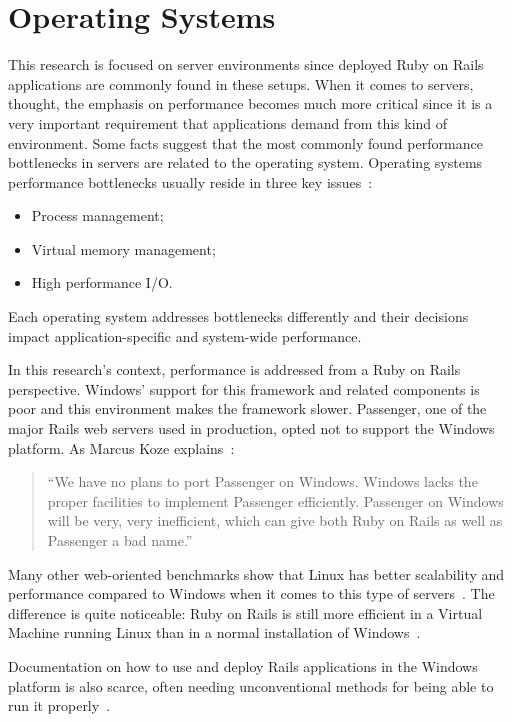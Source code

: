 \section{Operating Systems} %
\label{state:sec:operating_systems}

This research is focused on server environments since deployed Ruby on Rails applications are commonly found in these setups. When it comes to servers, thought, the emphasis on performance becomes much more critical since it is a very important requirement that applications demand from this kind of environment. Some facts suggest that the most commonly found performance bottlenecks in servers are related to the operating system. Operating systems performance bottlenecks usually reside in three key issues~\cite{os_performance_server}:
\begin{itemize}
\item Process management;
\item Virtual memory management;
\item High performance I/O.
\end{itemize}
Each operating system addresses bottlenecks differently and their decisions impact application-specific and system-wide performance.

In this research's context, performance is addressed from a Ruby on Rails perspective. Windows' support for this framework and related components is poor and this environment makes the framework slower. Passenger, one of the major Rails web servers used in production, opted not to support the Windows platform. As Marcus Koze explains~\cite{marcus_koze_passenger}:
\begin{quote}
  ``We have no plans to port Passenger on Windows. Windows lacks the proper facilities to implement Passenger efficiently. Passenger on Windows will be very, very inefficient, which can give both Ruby on Rails as well as Passenger a bad name.''
\end{quote}
Many other web-oriented benchmarks show that Linux has better scalability and performance compared to Windows when it comes to this type of servers~\cite{apache_tomcat_performance_linux_windows, php_apache_linux_windows}. The difference is quite noticeable: Ruby on Rails is still more efficient in a Virtual Machine running Linux than in a normal installation of Windows~\cite{linux_virtualbox_windows_rails}.

Documentation on how to use and deploy Rails applications in the Windows platform is also scarce, often needing unconventional methods for being able to run it properly~\cite{rails_windows}.

